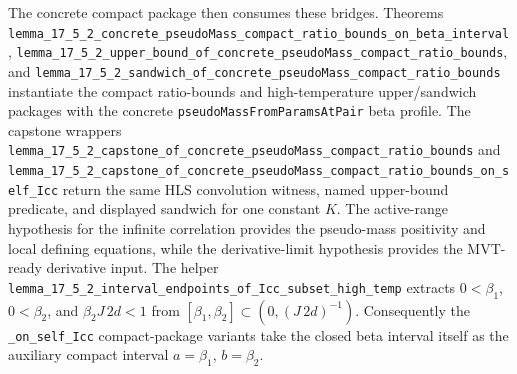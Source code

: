 \documentclass[a4paper,11pt]{article}
\begin{document}
The concrete compact package then consumes these bridges.  Theorems
\texttt{lemma\_17\_5\_2\_concrete\_pseudoMass\_compact\_ratio\_bounds\_on\_beta\_interval},
\texttt{lemma\_17\_5\_2\_upper\_bound\_of\_concrete\_pseudoMass\_compact\_ratio\_bounds},
and
\texttt{lemma\_17\_5\_2\_sandwich\_of\_concrete\_pseudoMass\_compact\_ratio\_bounds}
instantiate the compact ratio-bounds and high-temperature upper/sandwich
packages with the concrete \texttt{pseudoMassFromParamsAtPair} beta profile.
The capstone wrappers
\texttt{lemma\_17\_5\_2\_capstone\_of\_concrete\_pseudoMass\_compact\_ratio\_bounds}
and
\texttt{lemma\_17\_5\_2\_capstone\_of\_concrete\_pseudoMass\_compact\_ratio\_bounds\_on\_self\_Icc}
return the same HLS convolution witness, named upper-bound predicate, and
displayed sandwich for one constant \(K\).
The active-range hypothesis for the infinite correlation provides the
pseudo-mass positivity and local defining equations, while the derivative-limit
hypothesis provides the MVT-ready derivative input.
The helper
\texttt{lemma\_17\_5\_2\_interval\_endpoints\_of\_Icc\_subset\_high\_temp}
extracts \(0<\beta_1\), \(0<\beta_2\), and \(\beta_2J\,2d<1\) from
\([\beta_1,\beta_2]\subset(0,(J\,2d)^{-1})\).  Consequently the
\texttt{\_on\_self\_Icc} compact-package variants take the closed beta
interval itself as the auxiliary compact interval \(a=\beta_1\), \(b=\beta_2\).
\end{document}
